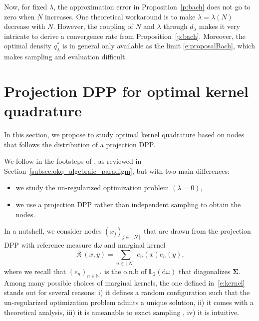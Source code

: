 \documentclass[twoside,11pt]{book}
\DeclareMathOperator*{\KDPP}{\mathfrak{K}}
\begin{document}
Now, for fixed $\lambda$, the approximation error in Proposition~\ref{p:bach} does not go to zero when $N$ increases. One theoretical  workaround is to make $\lambda=\lambda(N)$ decrease with $N$. However, the coupling of $N$ and $\lambda$ through $d_\lambda$ makes it very intricate to derive a convergence rate from Proposition~\ref{p:bach}.
Moreover, the optimal density $q_{\lambda}^*$ is in general only available as the limit \eqref{e:proposalBach}, which makes sampling and evaluation difficult. 


\section{Projection DPP for optimal kernel quadrature}\label{sec:pDPP_OKQ}
In this section, we propose to study optimal kernel quadrature based on nodes that follows the distribution of a projection DPP.



We follow in the footsteps of \cite{Bac17}, as reviewed in Section~\ref{subsec:okq_algebraic_paradigm}, but with two main differences:
\begin{itemize}
\item we study the un-regularized optimization problem $(\lambda = 0)$,
\item we use a projection DPP rather than independent sampling to obtain the nodes.
\end{itemize}

In a nutshell, we consider nodes $(x_{j})_{j \in [N]}$ that are drawn from the projection DPP with reference measure $\mathrm{d}\omega$ and marginal kernel
\begin{equation}
  \KDPP(x,y) = \sum\limits_{n \in [N]} e_{n}(x)e_{n}(y),
  \label{e:kernel}
\end{equation}
where we recall that $(e_{n})_{n \in \mathbb{N}^{*}}$ is the o.n.b of $\mathbb{L}_{2}(\mathrm{d}\omega)$ that diagonalizes $\bm{\Sigma}$. Among many possible choices of marginal kernels, the one defined in~\eqref{e:kernel} stands out for several reasons: i)
it defines a random configuration such that the un-regularized optimization problem admits a unique solution, ii) it comes with a theoretical analysis, iii) it is ameanable to exact sampling , iv) it is intuitive.
\end{document}
